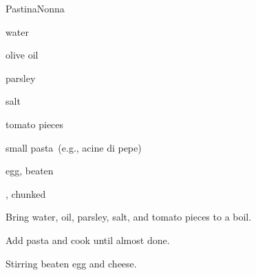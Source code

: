 \begin{recipe}{Pastina}{Nonna}{}

\begin{ingredients}
\item water
\item olive oil
\item parsley
\item salt
\item tomato pieces
\item small pasta~(e.g., acine di pepe)
\item egg, beaten
\item {}, chunked
\end{ingredients}

\begin{directions}
\item Bring water, oil, parsley, salt, and tomato pieces to a boil.
\item Add pasta and cook until almost done.
\item Stirring beaten egg and cheese.
\end{directions}

\end{recipe}
